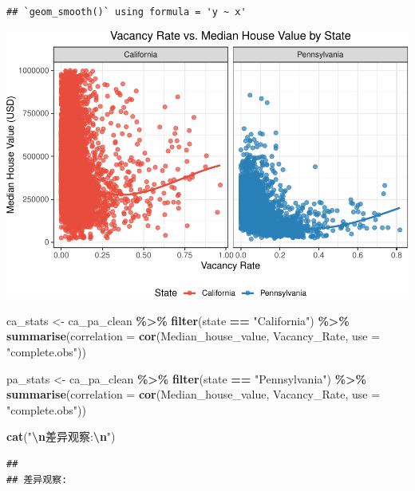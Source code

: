 \documentclass[
]{article}
\newenvironment{Shaded}{\begin{snugshade}}{\end{snugshade}}
\newcommand{\AttributeTok}[1]{\textcolor[rgb]{0.13,0.29,0.53}{#1}}
\newcommand{\FunctionTok}[1]{\textcolor[rgb]{0.13,0.29,0.53}{\textbf{#1}}}
\newcommand{\NormalTok}[1]{#1}
\newcommand{\OtherTok}[1]{\textcolor[rgb]{0.56,0.35,0.01}{#1}}
\newcommand{\SpecialCharTok}[1]{\textcolor[rgb]{0.81,0.36,0.00}{\textbf{#1}}}
\newcommand{\StringTok}[1]{\textcolor[rgb]{0.31,0.60,0.02}{#1}}
\begin{document}
\begin{verbatim}
## `geom_smooth()` using formula = 'y ~ x'
\end{verbatim}

\includegraphics{Homework-02_files/figure-latex/unnamed-chunk-10-1.pdf}

\begin{Shaded}
\begin{Highlighting}[]
\NormalTok{ca\_stats }\OtherTok{\textless{}{-}}\NormalTok{ ca\_pa\_clean }\SpecialCharTok{\%\textgreater{}\%}
  \FunctionTok{filter}\NormalTok{(state }\SpecialCharTok{==} \StringTok{"California"}\NormalTok{) }\SpecialCharTok{\%\textgreater{}\%}
  \FunctionTok{summarise}\NormalTok{(}\AttributeTok{correlation =} \FunctionTok{cor}\NormalTok{(Median\_house\_value, Vacancy\_Rate, }\AttributeTok{use =} \StringTok{"complete.obs"}\NormalTok{))}

\NormalTok{pa\_stats }\OtherTok{\textless{}{-}}\NormalTok{ ca\_pa\_clean }\SpecialCharTok{\%\textgreater{}\%}
  \FunctionTok{filter}\NormalTok{(state }\SpecialCharTok{==} \StringTok{"Pennsylvania"}\NormalTok{) }\SpecialCharTok{\%\textgreater{}\%}
  \FunctionTok{summarise}\NormalTok{(}\AttributeTok{correlation =} \FunctionTok{cor}\NormalTok{(Median\_house\_value, Vacancy\_Rate, }\AttributeTok{use =} \StringTok{"complete.obs"}\NormalTok{))}

\FunctionTok{cat}\NormalTok{(}\StringTok{"}\SpecialCharTok{\textbackslash{}n}\StringTok{差异观察:}\SpecialCharTok{\textbackslash{}n}\StringTok{"}\NormalTok{)}
\end{Highlighting}
\end{Shaded}

\begin{verbatim}
## 
## 差异观察:
\end{verbatim}
\end{document}
